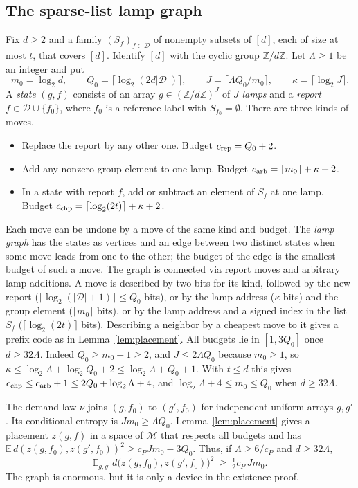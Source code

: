 \documentclass[11pt]{article}
\theoremstyle{remark}
\newcommand{\Z}{\mathbb Z}
\newcommand{\E}{\mathbb E}
\newcommand{\cM}{\mathcal M}
\newcommand{\cD}{\mathcal D}
\begin{document}
\subsection{The sparse-list lamp graph}\label{sec:graph}
Fix \(d\ge2\) and a family \((S_f)_{f\in\cD}\) of nonempty subsets of
\([d]\), each of size at most \(t\), that covers \([d]\). Identify
\([d]\) with the cyclic group \(\Z/d\Z\). Let \(\Lambda\ge1\) be an
integer and put
\[
 m_0=\log_2d,\qquad Q_0=\lceil\log_2(2d|\cD|)\rceil,\qquad
 J=\lceil\Lambda Q_0/m_0\rceil,\qquad\kappa=\lceil\log_2J\rceil .
\]
A \emph{state} \((g,f)\) consists of an array
\(g\in(\Z/d\Z)^J\) of \(J\) \emph{lamps} and a \emph{report}
\(f\in\cD\cup\{f_0\}\), where \(f_0\) is a reference label with
\(S_{f_0}=\emptyset\). There are three kinds of moves.
\begin{itemize}
\item Replace the report by any other one. Budget
\(c_{\rm rep}=Q_0+2\).
\item Add any nonzero group element to one lamp. Budget
\(c_{\rm arb}=\lceil m_0\rceil+\kappa+2\).
\item In a state with report \(f\), add or subtract an element of
\(S_f\) at one lamp. Budget
\(c_{\rm chp}=\lceil\log_2(2t)\rceil+\kappa+2\).
\end{itemize}
Each move can be undone by a move of the same kind and budget. The
\emph{lamp graph} has the states as vertices and an edge between two
distinct states when some move leads from one to the other; the budget of
the edge is the smallest budget of such a move. The graph is connected
via report moves and arbitrary lamp additions. A move
is described by two bits for its kind, followed by the new report
(\(\lceil\log_2(|\cD|+1)\rceil\le Q_0\) bits), or by the lamp address
(\(\kappa\) bits) and the group element (\(\lceil m_0\rceil\) bits), or
by the lamp address and a signed index in the list \(S_f\)
(\(\lceil\log_2(2t)\rceil\) bits). Describing a neighbor by a cheapest
move to it gives a prefix code as in Lemma~\ref{lem:placement}. All
budgets lie in \([1,3Q_0]\) once \(d\ge32\Lambda\). Indeed
\(Q_0\ge m_0+1\ge2\), and \(J\le2\Lambda Q_0\) because \(m_0\ge1\), so
\(\kappa\le\log_2\Lambda+\log_2Q_0+2\le\log_2\Lambda+Q_0+1\). With
\(t\le d\) this gives
\(c_{\rm chp}\le c_{\rm arb}+1\le2Q_0+\log_2\Lambda+4\), and
\(\log_2\Lambda+4\le m_0\le Q_0\) when \(d\ge32\Lambda\).

The demand law \(\nu\) joins \((g,f_0)\) to \((g',f_0)\) for independent
uniform arrays \(g,g'\). Its conditional entropy is \(Jm_0\ge\Lambda Q_0\).
Lemma~\ref{lem:placement} gives a placement \(z(g,f)\) in a space of
\(\cM\) that respects all budgets and has
\(\E\,d(z(g,f_0),z(g',f_0))^2\ge c_PJm_0-3Q_0\). Thus, if
\(\Lambda\ge6/c_P\) and \(d\ge32\Lambda\),
\begin{equation}\label{eq:spread}
 \E_{g,g'}\,d\bigl(z(g,f_0),z(g',f_0)\bigr)^2\ \ge\ \tfrac12c_P\,Jm_0 .
\end{equation}
The graph is enormous, but it is only a device in the existence proof.
\end{document}
